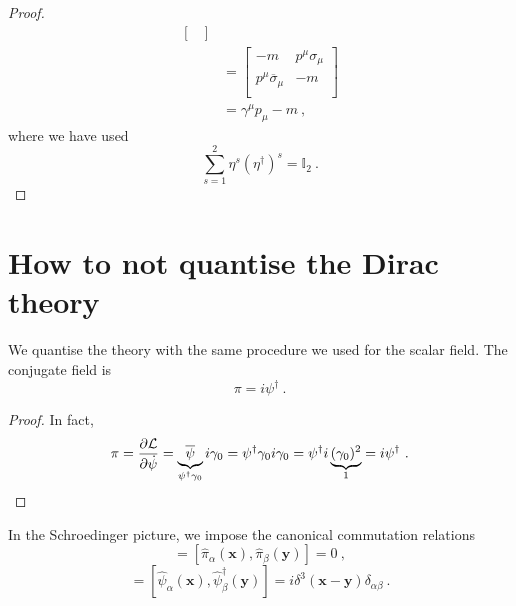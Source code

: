 \begin{proof}
\begin{equation*}
\begin{aligned}
\begin{bmatrix}
            \end{bmatrix} \\ & = \begin{bmatrix}
                - m & p^\mu \sigma_\mu \\ p^\mu \overline \sigma_\mu & - m \\
            \end{bmatrix} \\ & = \gamma^\mu p_\mu - m ~,
        \end{aligned}
        \end{equation*}
        where we have used 
        \begin{equation*}
            \sum_{s=1}^{2} \eta^s (\eta^\dagger)^s = \mathbb I_2 ~.
        \end{equation*}
    \end{proof}

\chapter{How to not quantise the Dirac theory}

    We quantise the theory with the same procedure we used for the scalar field. The conjugate field is 
    \begin{equation*}
        \pi = i \psi^\dagger ~.
    \end{equation*}

    \begin{proof}
        In fact, 
        \begin{equation*}
            \pi = \frac{\partial\mathcal L}{\partial\dot \psi} = \underbrace{\overline \psi}_{\psi^\dagger \gamma_0} i \gamma_0 = \psi^\dagger \gamma_0 i \gamma_0 = \psi^\dagger i \underbrace{(\gamma_0)^2}_{1} = i \psi^\dagger ~.
        \end{equation*}
    \end{proof}

    In the Schroedinger picture, we impose the canonical commutation relations
    \begin{equation*}
        [\hat \psi_\alpha (\mathbf x), \hat \psi_\beta (\mathbf y)] = [\hat \pi_\alpha (\mathbf x), \hat \pi_\beta (\mathbf y)] = 0 ~,
    \end{equation*}
    \begin{equation*}
        [\hat \psi_\alpha (\mathbf x), \hat \pi_\beta (\mathbf y)] = [\hat \psi_\alpha (\mathbf x), \hat \psi^\dagger_\beta (\mathbf y)] = i \delta^3 (\mathbf x - \mathbf y) \delta_{\alpha\beta} ~.
    \end{equation*}

